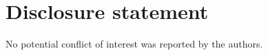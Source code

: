 \documentclass[11pt,reqno]{amsart}
\newcommand{\corr}[1]{\textcolor{blue}{#1}}
\begin{document}



\section*{Disclosure statement}

\noindent No potential conflict of interest was reported by the authors.
\end{document}
